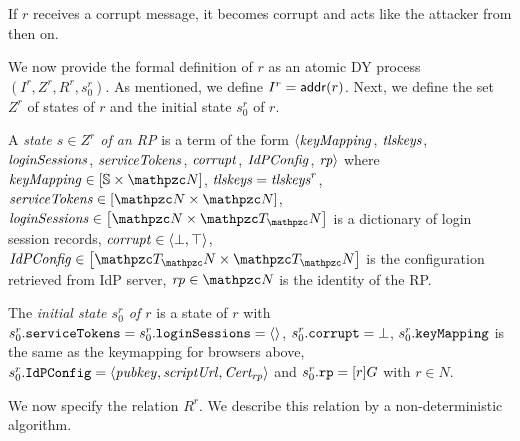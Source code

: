   If $r$ receives a corrupt message, it becomes corrupt and acts like
  the attacker from then on.
  
  We now provide the formal definition of $r$ as an atomic DY process
  $(I^r, Z^r, R^r, s^r_0)$. As mentioned, we define $I^r =
  \mathsf{addr}(r)$. Next, we define the set $Z^r$ of states of
  $r$ and the initial state $s^r_0$ of $r$.
  

  
  \begin{sloppypar}
    \begin{definition}\label{def:relying-parties}
      A \emph{state $s\in Z^r$ of an RP} is a term of the form
      $\langle\mathit{keyMapping}$, 
      $\mathit{tlskeys}$, 
      $\mathit{loginSessions}$, 
      $\mathit{serviceTokens}$, 
      $\mathit{corrupt}$, 
      $\mathit{IdPConfig}$, 
      $\mathit{rp}\rangle$ where 
      $\mi{keyMapping} \in \dict{\mathbb{S}}{\nonces}$,
      $\mathit{tlskeys}=\mathit{tlskeys}^r$,
      $\mi{serviceTokens} \in \dict{\nonces}{\nonces}$,
      $\mi{loginSessions} \in \dict{\nonces}{\terms}$ 
      is a dictionary of login session records,
      $\mathit{corrupt} \in \langle\bot,\top\rangle$,
      $\mi{IdPConfig} \in \dict{\terms}{\terms}$ 
      is the configuration retrieved from IdP server,
      $\mi{rp} \in \nonces$ is the identity of the RP.
  
      The \emph{initial state $s^r_0$ of $r$} is a state of 
      $r$ with $s^r_0.\mathtt{serviceTokens} = 
      s^r_0.\mathtt{loginSessions} = \langle\rangle$,
      $s^r_0.\mathtt{corrupt} = \bot$, 
      $s^r_0.\mathtt{keyMapping}$ 
      is the same as the keymapping for browsers above,
      $s^r_0.\mathtt{IdPConfig} = \langle\mathit{pubkey},\mathit{scriptUrl},\mathit{Cert_{rp}}\rangle$ and
      $s^r_0.\mathtt{rp} = [r]G$ with $r\in N$.
    \end{definition}
  \end{sloppypar}
  
  We now specify the relation $R^r$. We describe this relation by a non-deterministic algorithm. 
  
